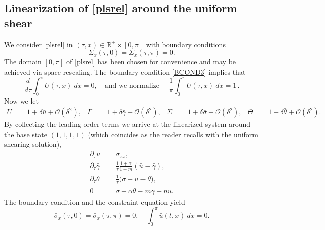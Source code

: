 \documentclass[a4paper,11pt]{article}
\theoremstyle{remark}
\begin{document}
\subsection{Linearization of \eqref{plsrel} around the uniform shear}

We consider \eqref{plsrel}
in $(\tau,x)\in \mathbb{R}^+\times [0,\pi]$ with boundary conditions
\begin{equation} \label{BCOND3}
 \Sigma_x(\tau,0)=\Sigma_x(\tau,\pi)=0.
\end{equation}
The domain $[0,\pi]$ of \eqref{plsrel} has been chosen for convenience and may be achieved via space rescaling.
The boundary condition \eqref{BCOND3} implies that
\begin{equation*}
 \frac{d}{d\tau}\int_0^\pi U(\tau,x) \: dx = 0, \quad \text{and we normalize } \quad  \frac{1}{\pi} \int_0^\pi U(\tau,x) \: dx = 1 \, .
\end{equation*}
Now we let
\begin{align*}
 U &= 1 + \delta \bar{u} + \mathcal{O}(\delta^2), & \Gamma &= 1 + \delta \bar\gamma + \mathcal{O}(\delta^2), &
 \Sigma &= 1 + \delta \bar\sigma + \mathcal{O}(\delta^2), & \Theta &= 1 + \delta \bar\theta + \mathcal{O}(\delta^2).
\end{align*}
By collecting the leading order terms we arrive at the linearized system around the base state $(1,1,1,1)$ (which coincides as the
reader recalls with the uniform shearing solution),
\begin{equation} \label{eq:linsystem}
 \begin{aligned}
  \partial_\tau \bar u &= \bar\sigma_{xx},\\
  \partial_\tau \bar\gamma &= \frac{1}{\tau}\frac{1+\alpha}{1+m}(\bar u-\bar\gamma),\\
  \partial_\tau \bar\theta &= \frac{1}{\tau}\Big(\bar\sigma+ \bar u -\bar\theta\Big),\\ %
  0&=\bar\sigma + \alpha\bar\theta -m\bar\gamma - n\bar u .
 \end{aligned}
\end{equation}
The boundary condition and the constraint equation yield
\begin{equation} \label{eq:linbdry}
 \bar\sigma_{x}(\tau,0)=\bar\sigma_{x}(\tau,\pi)=0, \quad \int_0^\pi \bar u(t,x) \: dx = 0.
\end{equation}
\end{document}
